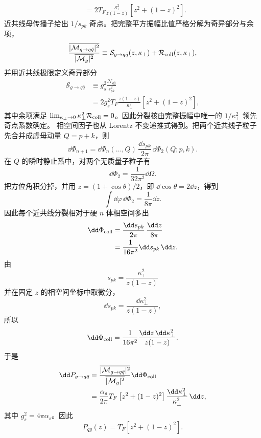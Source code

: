 \begin{derivation}[最低阶部分子分裂核]
\begin{align*}
 &=2T_F\frac{\kappa_\perp^2}{z(1-z)}
 \left[z^2+(1-z)^2\right].
\end{align*}
近共线母传播子给出 $1/s_{pk}$ 奇点。把完整平方振幅比值严格分解为奇异部分与余项，
\begin{equation*}
 \frac{\overline{|\mathcal M_{g\to q\bar q}|^2}}
 {\overline{|\mathcal M_{g}|^2}}
 \equiv
 \mathcal S_{g\to q\bar q}(z,\kappa_\perp)
 +\mathcal R_{\rm coll}(z,\kappa_\perp),
\end{equation*}
并用近共线极限定义奇异部分
\begin{align*}
 \mathcal S_{g\to q\bar q}
 &\equiv
 g_s^2\frac{\mathcal N_{q\bar q}}{s_{pk}^2}\\
 &=2g_s^2T_F
 \frac{z(1-z)}{\kappa_\perp^2}
 \left[z^2+(1-z)^2\right],
\end{align*}
其中余项满足 $\lim_{\kappa_\perp\to0}\kappa_\perp^2\mathcal R_{\rm coll}=0$。因此分裂核由完整振幅中唯一的 $1/\kappa_\perp^2$ 领先奇点系数确定。
相空间因子也从 Lorentz 不变递推式得到。把两个近共线子粒子先合并成虚母动量 $Q=p+k$，则
\begin{equation*}
 \dd\Phi_{n+1}
 =\dd\Phi_n(\ldots,Q)\,
 \frac{\dd s_{pk}}{2\pi}\,
 \dd\Phi_2(Q;p,k).
\end{equation*}
在 $Q$ 的瞬时静止系中，对两个无质量子粒子有
\begin{equation*}
 \dd\Phi_2
 =\frac1{32\pi^2}\dd\Omega.
\end{equation*}
把方位角积分掉，并用 $z=(1+\cos\theta)/2$，即 $\dd\cos\theta=2\dd z$，得到
\begin{equation*}
 \int\dd\varphi\,\dd\Phi_2
 =\frac1{8\pi}\dd z.
\end{equation*}
因此每个近共线分裂相对于硬 $n$ 体相空间多出
\begin{align*}
 \dd\Phi_{\rm coll}
 &=\frac{\dd s_{pk}}{2\pi}\,
 \frac{\dd z}{8\pi}\\
 &=\frac1{16\pi^2}\dd s_{pk}\,\dd z.
\end{align*}
由
\begin{equation*}
 s_{pk}=\frac{\kappa_\perp^2}{z(1-z)}
\end{equation*}
并在固定 $z$ 的相空间坐标中取微分，
\begin{equation*}
 \dd s_{pk}
 =\frac{\dd\kappa_\perp^2}{z(1-z)},
\end{equation*}
所以
\begin{equation*}
 \dd\Phi_{\rm coll}
 =\frac{1}{16\pi^2}
 \frac{\dd z\,\dd\kappa_\perp^2}{z(1-z)}.
\end{equation*}
于是
\begin{align*}
 \dd P_{g\to q\bar q}
 &=\frac{\overline{|\mathcal M_{g\to q\bar q}|^2}}
 {\overline{|\mathcal M_{g}|^2}}
 \dd\Phi_{\rm coll}\\
 &=\frac{\alpha_s}{2\pi}
 T_F\left[z^2+(1-z)^2\right]
 \frac{\dd\kappa_\perp^2}{\kappa_\perp^2}\,\dd z,
\end{align*}
其中 $g_s^2=4\pi\alpha_s$。因此
\begin{equation*}
 P_{qg}(z)=T_F\left[z^2+(1-z)^2\right].
\end{equation*}


\end{derivation}
